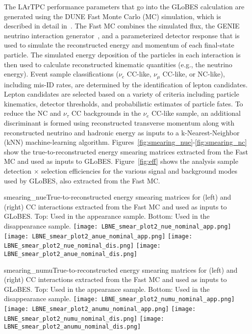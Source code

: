 The LArTPC performance parameters that go into the GLoBES calculation
are generated using the DUNE Fast Monte Carlo (MC) simulation, which
is described in detail in~\cite{Adams:2013qkq}.  The Fast MC combines
the simulated flux, the GENIE neutrino interaction
generator~\cite{Andreopoulos:2009rq}, and a parameterized detector
response that is used to simulate the reconstructed energy and
momentum of each final-state particle.  The simulated energy
deposition of the particles in each interaction is then used to
calculate reconstructed kinematic quantities (e.g., the neutrino
energy). Event sample classifications ($\nu_e$ CC-like, $\nu_{\mu}$
CC-like, or NC-like), including mis-ID rates, are determined by the
identification of lepton candidates. Lepton candidates are selected
based on a variety of criteria including particle kinematics,
detector thresholds, and probabilistic estimates of particle fates. To
reduce the NC and $\nu_{\tau}$ CC backgrounds in the $\nu_e$ CC-like
sample, an additional discriminant is formed using reconstructed
transverse momentum along with reconstructed neutrino and hadronic
energy as inputs to a k-Nearest-Neighbor (kNN) machine-learning
algorithm.  Figures~\ref{fig:smearing_nue}-\ref{fig:smearing_nc} show
the true-to-reconstructed energy smearing matrices extracted from the
Fast MC and  used as inputs to GLoBES.  Figure~\ref{fig:eff} shows the
analysis sample detection $\times$ selection efficiencies for the
various signal and background modes used by GLoBES, also extracted
from the Fast MC.

\begin{cdrfigure}{smearing_nue}{True-to-reconstructed energy smearing matrices for \nue (left) and \anue (right) CC interactions extracted from the Fast MC and used as inputs to GLoBES.  Top: Used in the appearance sample.  Bottom: Used in the disappearance sample.}
 \texttt{[image: LBNE\_smear\_plot2\_nue\_nominal\_app.png]}
 \texttt{[image: LBNE\_smear\_plot2\_anue\_nominal\_app.png]}
 \texttt{[image: LBNE\_smear\_plot2\_nue\_nominal\_dis.png]}
 \texttt{[image: LBNE\_smear\_plot2\_anue\_nominal\_dis.png]}
\end{cdrfigure}

\begin{cdrfigure}{smearing_numu}{True-to-reconstructed energy smearing matrices for \numu (left) and \anumu (right)  CC interactions extracted from the Fast MC and used as inputs to GLoBES.  Top: Used in the appearance sample.  Bottom: Used in the disappearance sample.}
 \texttt{[image: LBNE\_smear\_plot2\_numu\_nominal\_app.png]}
 \texttt{[image: LBNE\_smear\_plot2\_anumu\_nominal\_app.png]}
 \texttt{[image: LBNE\_smear\_plot2\_numu\_nominal\_dis.png]}
 \texttt{[image: LBNE\_smear\_plot2\_anumu\_nominal\_dis.png]}
\end{cdrfigure}


